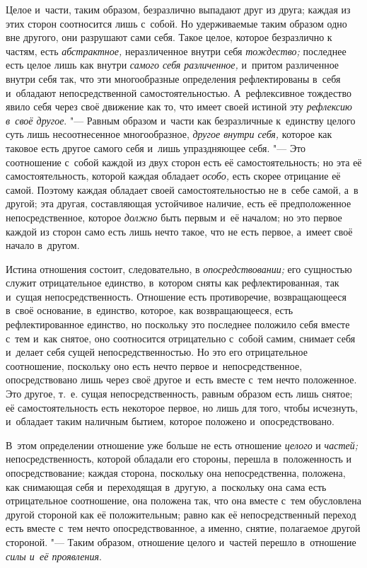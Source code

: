 Целое и~части, таким образом, безразлично выпадают друг из друга; каждая из
этих сторон соотносится лишь с~собой. Но удерживаемые таким образом одно
вне другого, они разрушают сами себя. Такое целое, которое безразлично к
частям, есть {\em абстрактное,} неразличенное внутри
себя {\em тождество;} последнее есть целое лишь как
внутри {\em самого себя различенное,} и~притом
различенное внутри себя так, что эти многообразные определения
рефлектированы в~себя и~обладают непосредственной самостоятельностью.
А~рефлексивное тождество явило себя через своё движение как то, что имеет
своей истиной эту {\em рефлексию в~своё другое}. "---
Равным образом и~части как безразличные к~единству целого суть лишь
несоотнесенное многообразное, {\em другое внутри себя,}
которое как таковое есть другое самого себя и~лишь упраздняющее себя. "--- Это
соотношение с~собой каждой из двух сторон есть её самостоятельность; но эта
её самостоятельность, которой каждая обладает
{\em особо,} есть скорее отрицание её самой. Поэтому
каждая обладает своей самостоятельностью не в~себе самой, а~в другой; эта
другая, составляющая устойчивое наличие, есть её предположенное
непосредственное, которое {\em должно} быть первым и~её
началом; но это первое каждой из сторон само есть лишь нечто такое, что не
есть первое, а~имеет своё начало в~другом.

Истина отношения состоит, следовательно, в
{\em опосредствовании;} его сущностью служит
отрицательное единство, в~котором сняты как рефлектированная, так и~сущая
непосредственность. Отношение есть противоречие, возвращающееся в~своё
основание, в~единство, которое, как возвращающееся, есть рефлектированное
единство, но поскольку это последнее положило себя вместе с~тем и~как
снятое, оно соотносится отрицательно с~собой самим, снимает себя и~делает
себя сущей непосредственностью. Но это его отрицательное соотношение,
поскольку оно есть нечто первое и~непосредственное, опосредствовано лишь
через своё другое и~есть вместе с~тем нечто положенное. Это другое, т.~е.
сущая непосредственность, равным образом есть лишь снятое; её
самостоятельность есть некоторое первое, но лишь для того, чтобы исчезнуть,
и~обладает таким наличным бытием, которое положено и~опосредствовано.

В~этом определении отношение уже больше не есть отношение
{\em целого} и {\em частей;}
непосредственность, которой обладали его стороны, перешла в~положенность и
опосредствование; каждая сторона, поскольку она непосредственна, положена,
как снимающая себя и~переходящая в~другую, а~поскольку она сама есть
отрицательное соотношение, она положена так, что она вместе с~тем
обусловлена другой стороной как её положительным; равно как её
непосредственный переход есть вместе с~тем нечто опосредствованное, а
именно, снятие, полагаемое другой стороной. "--- Таким образом, отношение
целого и~частей перешло в~отношение {\em силы и~её проявления}.

